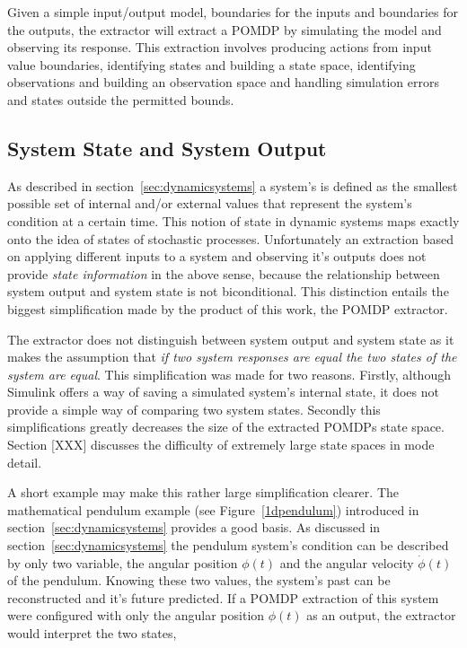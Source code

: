 Given a simple input/output model, boundaries for the inputs and boundaries for the outputs, the extractor will extract a POMDP by simulating the model and observing its response. This extraction involves producing actions from input value boundaries, identifying states and building a state space, identifying observations and building an observation space and handling simulation errors and states outside the permitted bounds.

\subsection{System State and System Output}
\label{subsec:stateoutput}

As described in section~\ref{sec:dynamicsystems} a system's  is defined as the smallest possible set of internal and/or external values that represent the system's condition at a certain time. This notion of state in dynamic systems maps exactly onto the idea of states of stochastic processes. Unfortunately an extraction based on applying different inputs to a system and observing it's outputs does not provide \textit{state information} in the above sense, because the relationship between system output and system state is not biconditional. This distinction entails the biggest simplification made by the product of this work, the POMDP extractor.

The extractor does not distinguish between system output and system state as it makes the assumption that \textit{if two system responses are equal the two states of the system are equal}. This simplification was made for two reasons. Firstly, although Simulink offers a way of saving a simulated system's internal state, it does not provide a simple way of comparing two system states. Secondly this simplifications greatly decreases the size of the extracted POMDPs state space. Section [XXX] discusses the difficulty of extremely large state spaces in mode detail.

A short example may make this rather large simplification clearer. The mathematical pendulum example (see Figure~\ref{1dpendulum}) introduced in section~\ref{sec:dynamicsystems} provides a good basis. As discussed in section~\ref{sec:dynamicsystems} the pendulum system's condition can be described by only two variable, the angular position $\phi(t)$ and the angular velocity $\dot{\phi}(t)$ of the pendulum. Knowing these two values, the system's past can be reconstructed and it's future predicted. If a POMDP extraction of this system were configured with only the angular position $\phi(t)$ as an output, the extractor would interpret the two states,

